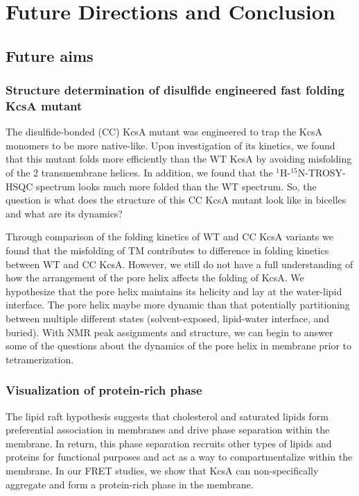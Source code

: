 \chapter{Future Directions and Conclusion}

\section{Future aims}
\subsection{Structure determination of disulfide engineered fast folding KcsA mutant}
The disulfide-bonded (CC) KcsA mutant was engineered to trap the KcsA monomers to be more native-like. Upon investigation of its kinetics, we found that this mutant folds more efficiently than the WT KcsA by avoiding misfolding of the 2 transmembrane helices. In addition, we found that the $^{1}$H-$^{15}$N-TROSY-HSQC spectrum looks much more folded than the WT spectrum. So, the question is what does the structure of this CC KcsA mutant look like in bicelles and what are its dynamics?

Through comparison of the folding kinetics of WT and CC KcsA variants we found that the misfolding of TM contributes to difference in folding kinetics between WT and CC KcsA. However, we still do not have a full understanding of how the arrangement of the pore helix affects the folding of KcsA. We hypothesize that the pore helix maintains its helicity and lay at the water-lipid interface. The pore helix maybe more dynamic than that potentially partitioning between multiple different states (solvent-exposed, lipid-water interface, and buried). With NMR peak assignments and structure, we can begin to answer some of the questions about the dynamics of the pore helix in membrane prior to tetramerization.

\subsection{Visualization of protein-rich phase}
The lipid raft hypothesis suggests that cholesterol and saturated lipids form preferential association in membranes and drive phase separation within the membrane. In return, this phase separation recruits other types of lipids and proteins for functional purposes and act as a way to compartmentalize within the membrane. In our FRET studies, we show that KcsA can non-specifically aggregate and form a protein-rich phase in the membrane.

